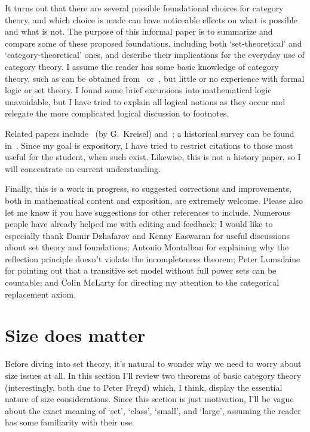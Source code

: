 \documentclass{amsart}
\begin{document}
It turns out that there are several possible foundational choices for
category theory, and which choice is made can have noticeable effects
on what is possible and what is not.  The purpose of this informal
paper is to summarize and compare some of these proposed foundations,
including both `set-theoretical' and `category-theoretical' ones, and
describe their implications for the everyday use of category theory.
I assume the reader has some basic knowledge of category theory, such
as can be obtained from~\cite{maclane} or~\cite{awodey:cat-thy}, but
little or no experience with formal logic or set theory.  I found some
brief excursions into mathematical logic unavoidable, but I have tried
to explain all logical notions as they occur and relegate the more
complicated logical discussion to footnotes.

Related papers include~\cite[Appendix II]{feferman:fdns-of-ct} (by G.\
Kreisel) and~\cite{blass:ct-setth}; a historical survey can be found
in~\cite{kromer:tool-object}.  Since my goal is expository, I have
tried to restrict citations to those most useful for the student, when
such exist.  Likewise, this is not a history paper, so I will
concentrate on current understanding.

Finally, this is a work in progress, so suggested corrections and
improvements, both in mathematical content and exposition, are
extremely welcome.  Please also let me know if you have suggestions
for other references to include.  Numerous people have already helped
me with editing and feedback; I would like to especially thank Damir
Dzhafarov and Kenny Easwaran for useful discussions about set theory
and foundations; Antonio Montalban for explaining why the reflection
principle doesn't violate the incompleteness theorem; Peter Lumsdaine
for pointing out that a transitive set model without full power sets
can be countable; and Colin McLarty for directing my attention to the
categorical replacement axiom.


\section{Size does matter}
\label{sec:size-does-matter}

Before diving into set theory, it's natural to wonder why we need to
worry about size issues at all.  In this section I'll review two
theorems of basic category theory (interestingly, both due to Peter
Freyd) which, I think, display the essential nature of size
considerations.  Since this section is just motivation, I'll be vague
about the exact meaning of `set', `class', `small', and `large',
assuming the reader has some familiarity with their use.
\end{document}
